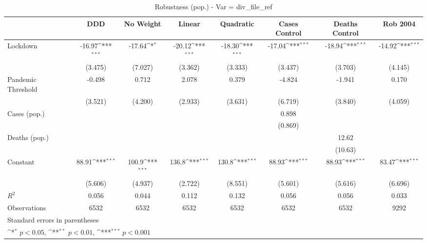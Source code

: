 \documentclass{article}
\begin{document}
{
\def\sym#1{\ifmmode^{#1}\else\(^{#1}\)\fi}
\begin{longtable}{l*{7}{c}}
\caption{Robustness (pop.) - Var = div\_file\_ref}\\
\hline\hline\endfirsthead\hline\endhead\hline\endfoot\endlastfoot
                &\multicolumn{1}{c}{DDD}&\multicolumn{1}{c}{No Weight}&\multicolumn{1}{c}{Linear}&\multicolumn{1}{c}{Quadratic}&\multicolumn{1}{c}{Cases Control}&\multicolumn{1}{c}{Deaths Control}&\multicolumn{1}{c}{Rob 2004}\\
\hline
Lockdown        &   -16.97\sym{***}&   -17.64\sym{*}  &   -20.12\sym{***}&   -18.30\sym{***}&   -17.04\sym{***}&   -18.94\sym{***}&   -14.92\sym{***}\\
                &  (3.475)         &  (7.027)         &  (3.362)         &  (3.333)         &  (3.437)         &  (3.703)         &  (4.145)         \\
Pandemic Threshold&   -0.498         &    0.712         &    2.078         &    0.379         &   -4.824         &   -1.941         &    0.170         \\
                &  (3.521)         &  (4.200)         &  (2.933)         &  (3.631)         &  (6.719)         &  (3.840)         &  (4.059)         \\
Cases (pop.)    &                  &                  &                  &                  &    0.898         &                  &                  \\
                &                  &                  &                  &                  &  (0.869)         &                  &                  \\
Deaths (pop.)   &                  &                  &                  &                  &                  &    12.62         &                  \\
                &                  &                  &                  &                  &                  &  (10.63)         &                  \\
Constant        &    88.91\sym{***}&    100.9\sym{***}&    136.8\sym{***}&    130.8\sym{***}&    88.93\sym{***}&    88.93\sym{***}&    83.47\sym{***}\\
                &  (5.606)         &  (4.937)         &  (2.722)         &  (8.551)         &  (5.601)         &  (5.616)         &  (6.696)         \\
\hline
\(R^{2}\)       &    0.056         &    0.044         &    0.112         &    0.132         &    0.056         &    0.056         &    0.033         \\
Observations    &     6532         &     6532         &     6532         &     6532         &     6532         &     6532         &     9292         \\
\hline\hline
\multicolumn{8}{l}{\footnotesize Standard errors in parentheses}\\
\multicolumn{8}{l}{\footnotesize \sym{*} \(p<0.05\), \sym{**} \(p<0.01\), \sym{***} \(p<0.001\)}\\
\end{longtable}
}
\end{document}
